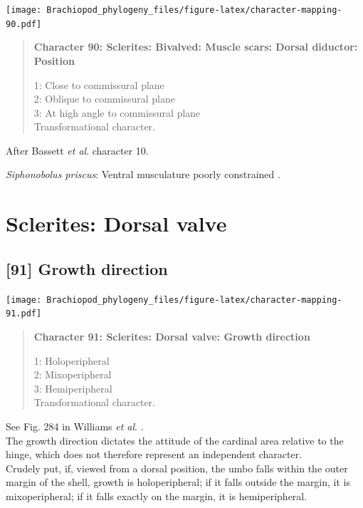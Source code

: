 \documentclass[openany]{book}
\begin{document}
\texttt{[image: Brachiopod\_phylogeny\_files/figure-latex/character-mapping-90.pdf]}

\begin{quote}
\textbf{Character 90: Sclerites: Bivalved: Muscle scars: Dorsal
diductor: Position}

1: Close to commissural plane\\
2: Oblique to commissural plane\\
3: At high angle to commissural plane\\
Transformational character.
\end{quote}

After Bassett \emph{et al}.
\citeyearpar{Bassett2001Functionalmorphology} character 10.

\hypertarget{Siphonobolus_priscus-coding-90}{}
\emph{Siphonobolus priscus}: Ventral musculature poorly constrained
\citep{Williams2000LinguliformeaCraniiformea, Popov2009Earlyontogeny}.

\section{Sclerites: Dorsal valve}\label{sclerites-dorsal-valve}

\subsection*{{[}91{]} Growth direction}\label{growth-direction}

\texttt{[image: Brachiopod\_phylogeny\_files/figure-latex/character-mapping-91.pdf]}

\begin{quote}
\textbf{Character 91: Sclerites: Dorsal valve: Growth direction}

1: Holoperipheral\\
2: Mixoperipheral\\
3: Hemiperipheral\\
Transformational character.
\end{quote}

See Fig. 284 in Williams \emph{et al}.
\citeyearpar{Williams1997Introduction}.\\
The growth direction dictates the attitude of the cardinal area relative
to the hinge, which does not therefore represent an independent
character.\\
Crudely put, if, viewed from a dorsal position, the umbo falls within
the outer margin of the shell, growth is holoperipheral; if it falls
outside the margin, it is mixoperipheral; if it falls exactly on the
margin, it is hemiperipheral.
\end{document}
